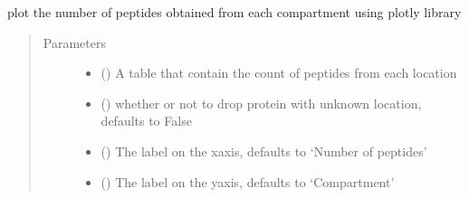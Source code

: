 \documentclass[letterpaper,10pt,english]{sphinxmanual}
\begin{document}
\begin{fulllineitems}
\label{\detokenize{IPTK.Visualization:IPTK.Visualization.vizTools.plotly_num_peptides_per_location}}
plot the number of peptides obtained from each compartment using plotly library
\begin{quote}\begin{description}
\item[{Parameters}] \leavevmode\begin{itemize}
\item {} 
 () \textendash{} A table that contain the count of peptides from each  location

\item {} 
 (\sphinxstyleliteralemphasis{\sphinxupquote{, }}) \textendash{} whether or not to drop protein with unknown location, defaults to False

\item {} 
 (\sphinxstyleliteralemphasis{\sphinxupquote{, }}) \textendash{} The label on the x\sphinxhyphen{}axis, defaults to ‘Number of peptides’

\item {} 
 (\sphinxstyleliteralemphasis{\sphinxupquote{, }}) \textendash{} The label on the y\sphinxhyphen{}axis, defaults to ‘Compartment’


\end{itemize}
\end{description}
\end{quote}
\end{fulllineitems}
\end{document}
